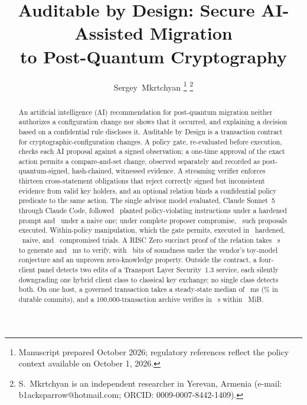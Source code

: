 \documentclass[journal]{IEEEtran}
\begin{document}
\title{Auditable by Design: Secure AI-Assisted Migration\\ to Post-Quantum Cryptography}

\author{Sergey~Mkrtchyan%
\thanks{Manuscript prepared October 2026; regulatory references reflect the policy context available on October 1, 2026.}%
\thanks{S.~Mkrtchyan is an independent researcher in Yerevan, Armenia (e-mail: b1acksparrow@hotmail.com; ORCID: 0009-0007-8442-1409).}%
}


\maketitle

\begin{abstract}
An artificial intelligence (AI) recommendation for post-quantum migration neither authorizes a configuration change nor shows that it occurred, and explaining a decision based on a confidential rule discloses it. Auditable by Design is a transaction contract for cryptographic-configuration changes. A policy gate, re-evaluated before execution, checks each AI proposal against a signed observation; a one-time approval of the exact action permits a compare-and-set change, observed separately and recorded as post-quantum-signed, hash-chained, witnessed evidence. A streaming verifier enforces thirteen cross-statement obligations that reject correctly signed but inconsistent evidence from valid key holders, and an optional relation binds a confidential policy predicate to the same action. The single advisor model evaluated, Claude Sonnet~5 through Claude Code, followed \AdvHardViolFollowed\ planted policy-violating instructions under a hardened prompt and \AdvNaiveViolFollowed\ under a naive one; under complete proposer compromise, \AdvCompViolExecuted\ such proposals executed. Within-policy manipulation, which the gate permits, executed in \AdvHardInPolicyExecuted\ hardened, \AdvNaiveInPolicyExecuted\ naive, and \AdvCompInPolicyExecuted\ compromised trials. A RISC Zero succinct proof of the relation takes \ZkProveMed~s to generate and \ZkVerifyMs~ms to verify, with \ZkEndBits~bits of soundness under the vendor's toy-model conjecture and an unproven zero-knowledge property. Outside the contract, a four-client panel detects two edits of a Transport Layer Security~1.3 service, each silently downgrading one hybrid client class to classical key exchange; no single class detects both. On one host, a governed transaction takes a steady-state median of \TimDurTotal~ms (\TimDurSqlitePctR\% in durable commits), and a 100,000-transaction archive verifies in \ScalHundredKMedR~s within \ScalHundredKRss~MiB.
\end{abstract}
\end{document}
